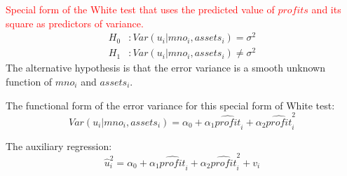 \documentclass[12pt]{report}
\begin{document}
\noindent \textcolor{red}{Special form of the White test that uses the predicted value of $profits$ and its square as predictors of variance.} 
\begin{align*}
	H_0&: Var(u_i|mno_i,assets_i) = \sigma^2 \\
	H_1&: Var(u_i|mno_i,assets_i) \neq \sigma^2
\end{align*} The alternative hypothesis is that the error variance is a smooth unknown function of $mno_i$ and $assets_i$.

\noindent The functional form of the error variance for this special form of White test: $$Var(u_i|mno_i,assets_i) = \alpha_0 + \alpha_1 \widehat{profit}_i + \alpha_2 \widehat{profit}_i^2$$

\noindent The auxiliary regression: $$\hat{u}^2_i = \alpha_0 + \alpha_1 \widehat{profit}_i + \alpha_2 \widehat{profit}_i^2 + v_i$$
\end{document}
